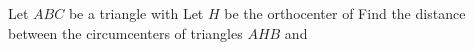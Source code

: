 Let $ABC$ be a triangle with    Let $H$ be the orthocenter of  Find the distance between the circumcenters of triangles $AHB$ and 